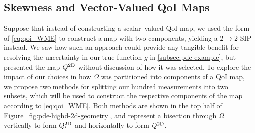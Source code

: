 \FloatBarrier
\subsection{Skewness and Vector-Valued QoI Maps}

Suppose that instead of constructing a scalar--valued QoI map, we used the form of \eqref{eq:qoi_WME} to construct a map with two components, yielding a $2 \rightarrow 2$ SIP instead.
We saw how such an approach could provide any tangible benefit for resolving the uncertainty in our true function $g$ in \ref{subsec:pde-example}, but presented the map $Q^\text{2D}$ without discussion of how it was selected.
To explore the impact of our choices in how $\Omega$ was partitioned into components of a QoI map, we propose two methods for splitting our hundred measurements into two subsets, which will be used to construct the respective components of the map according to \eqref{eq:qoi_WME}.
Both methods are shown in the top half of Figure~\ref{fig:pde-highd-2d-geometry}, and represent a bisection through $\Omega$ vertically to form $Q^\text{2D}_\prime$ and horizontally to form $Q^\text{2D}$.

